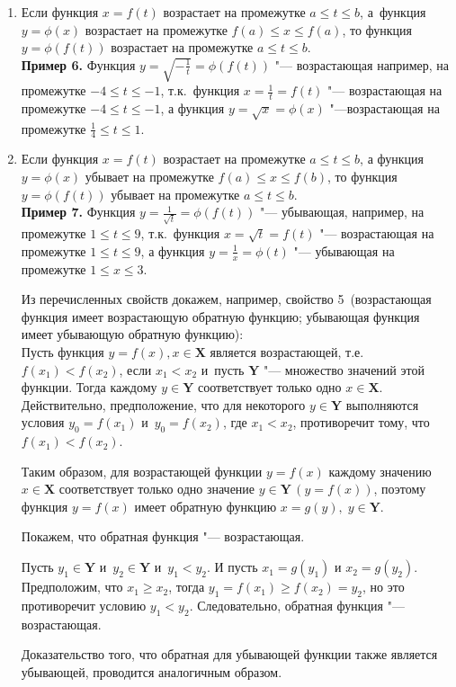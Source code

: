 \begin{enumerate}
\item Если функция $x = f(t)$ возрастает на промежутке
$a \leqslant t \leqslant b$, а~функция $y = \phi(x)$ возрастает
на промежутке $f(a) \leqslant x \leqslant f(a)$,
то функция $y = \phi(f(t))$ возрастает на промежутке
$a \leqslant t \leqslant b$. \\
\textbf{Пример 6.} Функция
$\displaystyle y = \sqrt{-\frac{1}{t}} = \phi(f(t))$ "--- возрастающая
например, на промежутке $-4 \leqslant t \leqslant -1$,
т.к.\ функция $\displaystyle x = \frac{1}{t} = f(t)$ "--- возрастающая
на промежутке $-4 \leqslant t \leqslant -1$,
а функция $y = \sqrt{x} = \phi(x)$ "---возрастающая на промежутке
$\displaystyle \frac{1}{4} \leqslant t \leqslant 1$.

\item Если функция $x = f(t)$  возрастает на промежутке
$a \leqslant t \leqslant b$,
а функция $y = \phi(x)$ убывает на промежутке
$f(a) \leqslant x \leqslant f(b)$, 
то функция $y = \phi(f(t))$ убывает на промежутке
$a \leqslant t \leqslant b$. \\
\textbf{Пример 7.} Функция
$\displaystyle y = \frac{1}{\sqrt{t}} = \phi(f(t))$ "--- убывающая,
например, на промежутке $1 \leqslant t \leqslant 9$,
т.к.\ функция $x = \sqrt{t} = f(t)$ "--- возрастающая на промежутке
$1 \leqslant t \leqslant 9$, а функция
$\displaystyle y = \frac{1}{x} = \phi(t)$
"--- убывающая на промежутке $1 \leqslant x \leqslant 3$.

Из перечисленных свойств докажем, например, свойство 5~(возрастающая
функция имеет возрастающую обратную функцию; убывающая функция имеет
убывающую обратную функцию): \\
Пусть функция $y = f(x), x \in \mathbf{X}$ является возрастающей,
т.е.\ $f(x_{1}) < f(x_{2})$, если $x_{1} < x_{2}$ и~пусть $\mathbf{Y}$
"--- множество значений этой функции. Тогда каждому $y \in \mathbf{Y}$
соответствует только одно $x \in \mathbf{X}$.
Действительно, предположение, что для некоторого $y \in \mathbf{Y}$
выполняются условия $y_{0} = f(x_{1})$ и~$y_{0} = f(x_{2})$,
где $x_{1} < x_{2}$, противоречит тому, что $f(x_{1}) < f(x_{2})$.

Таким образом, для возрастающей функции $y = f(x)$ каждому значению
$x \in \mathbf{X}$ соответствует только одно значение
$y \in \mathbf{Y} \, (y = f(x))$, поэтому функция $y = f(x)$ имеет
обратную функцию $x = g(y), \; y \in \mathbf{Y}$.

Покажем, что обратная функция "--- возрастающая.

Пусть $y_{1} \in \mathbf{Y}$ и~$y_{2} \in \mathbf{Y}$ и~$y_{1} < y_{2}$.
И пусть $x_{1} = g(y_{1})$ и $x_{2} = g(y_{2})$.
Предположим, что $x_{1} \geqslant x_{2}$, тогда
$y_{1} = f(x_{1}) \geqslant f(x_{2}) = y_{2}$, но это противоречит условию
$y_{1} < y_{2}$. Следовательно, обратная функция "--- возрастающая.

Доказательство того, что обратная для убывающей функции также является
убывающей, проводится аналогичным образом.

\end{enumerate}
